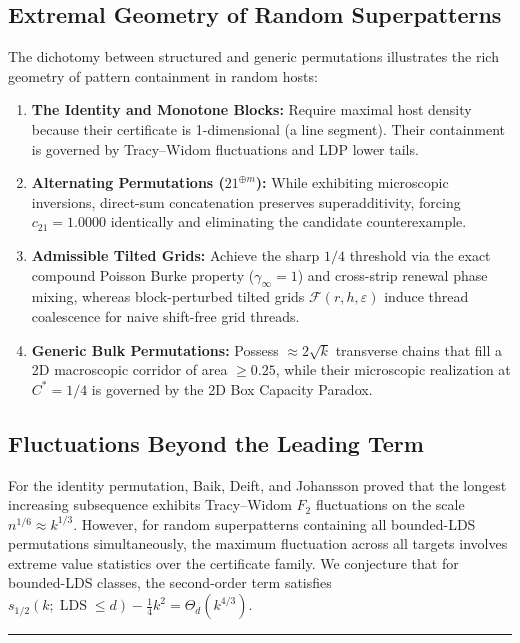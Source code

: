 \documentclass[
  11pt,
]{article}
\begin{document}
\subsection{Extremal Geometry of Random Superpatterns}\label{sec:extremal-geometry}

The dichotomy between structured and generic permutations illustrates the rich geometry of pattern containment in random hosts:
\begin{enumerate}
\item \textbf{The Identity and Monotone Blocks:} Require maximal host density because their certificate is 1-dimensional (a line segment). Their containment is governed by Tracy--Widom fluctuations and LDP lower tails.
\item \textbf{Alternating Permutations ($21^{\oplus m}$):} While exhibiting microscopic inversions, direct-sum concatenation preserves superadditivity, forcing $c_{21} = 1.0000$ identically and eliminating the candidate counterexample.
\item \textbf{Admissible Tilted Grids:} Achieve the sharp $1/4$ threshold via the exact compound Poisson Burke property ($\gamma_\infty = 1$) and cross-strip renewal phase mixing, whereas block-perturbed tilted grids $\mathcal{F}(r, h, \varepsilon)$ induce thread coalescence for naive shift-free grid threads.
\item \textbf{Generic Bulk Permutations:} Possess $\approx 2\sqrt{k}$ transverse chains that fill a 2D macroscopic corridor of area $\ge 0.25$, while their microscopic realization at $C^* = 1/4$ is governed by the 2D Box Capacity Paradox.
\end{enumerate}

\subsection{Fluctuations Beyond the Leading Term}\label{sec:fluctuations}

For the identity permutation, Baik, Deift, and Johansson proved that the longest increasing subsequence exhibits Tracy--Widom $F_2$ fluctuations on the scale $n^{1/6} \approx k^{1/3}$. However, for random superpatterns containing all bounded-LDS permutations simultaneously, the maximum fluctuation across all targets involves extreme value statistics over the certificate family. We conjecture that for bounded-LDS classes, the second-order term satisfies $s_{1/2}(k; \operatorname{LDS} \le d) - \frac{1}{4} k^2 = \Theta_d(k^{4/3})$.

\begin{center}\rule{0.5\linewidth}{0.5pt}\end{center}
\end{document}
